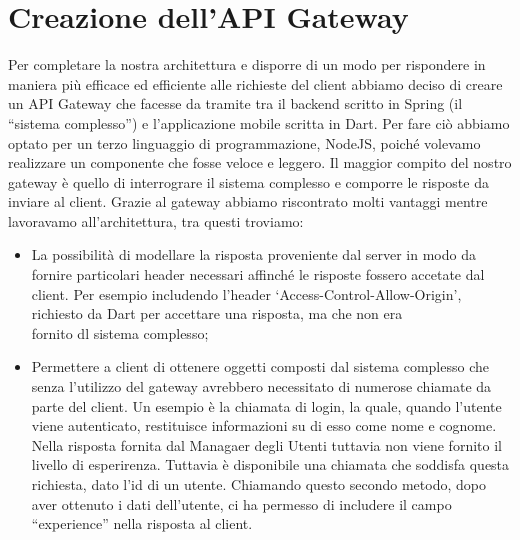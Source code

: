 \section{Creazione dell'API Gateway}
Per completare la nostra architettura e disporre di un modo per rispondere in maniera più efficace ed efficiente alle richieste del client abbiamo deciso di creare un API Gateway che facesse da tramite tra il backend scritto in Spring (il ``sistema complesso'') e l'applicazione mobile scritta in Dart. Per fare ciò abbiamo optato per un terzo linguaggio di programmazione, NodeJS, poiché volevamo realizzare un componente che fosse veloce e leggero. Il maggior compito del nostro gateway è quello di interrograre il sistema complesso e comporre le risposte da inviare al client. Grazie al gateway abbiamo riscontrato molti vantaggi mentre lavoravamo all'architettura, tra questi troviamo:
\begin{itemize}
  \item La possibilità di modellare la risposta proveniente dal server in modo da fornire particolari header necessari affinché le risposte fossero accetate dal client. Per esempio includendo l'header `Access-Control-Allow-Origin', richiesto da Dart per accettare una risposta, ma che non era \\ fornito dl sistema complesso;
  \item Permettere a client di ottenere oggetti composti dal sistema complesso che senza l'utilizzo del gateway avrebbero necessitato di numerose chiamate da parte del client. Un esempio è la chiamata di login, la quale, quando l'utente viene autenticato, restituisce informazioni su di esso come nome e cognome. Nella risposta fornita dal Managaer degli Utenti tuttavia non viene fornito il livello di esperirenza. Tuttavia è disponibile una chiamata che soddisfa questa richiesta, dato l'id di un utente. Chiamando questo secondo metodo, dopo aver ottenuto i dati dell'utente, ci ha permesso di includere il campo ``experience'' nella risposta al client.  
\end{itemize}